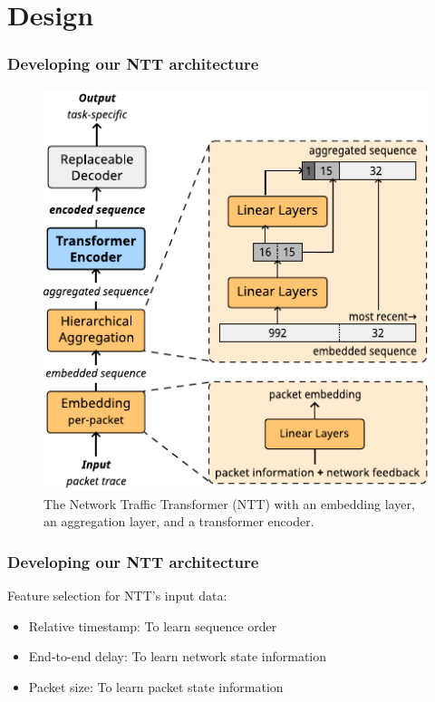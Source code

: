 \documentclass{beamer}
\begin{document}

\section{Design}


\begin{frame}
\frametitle{Developing our NTT architecture}
\pause

\begin{figure}[!hbt]
  \begin{center}
    \includegraphics[scale=0.8]{figures/architecture_ntt.pdf}
    \caption{The Network Traffic Transformer (NTT) with
        an embedding layer, %
        an aggregation layer, and
        a transformer encoder.}
    \label{fig:ntt}
  \end{center}
\end{figure}
\end{frame}

\begin{frame}
\frametitle{Developing our NTT architecture}

Feature selection for NTT's input data:
\pause 
\begin{itemize}
    \item<1-> \alert{Relative timestamp:} To learn sequence order
    \item<1-> \alert{End-to-end delay:} To learn network state information
    \item<1-> \alert{Packet size:} To learn packet state information
\end{itemize}

\end{frame}
\end{document}
